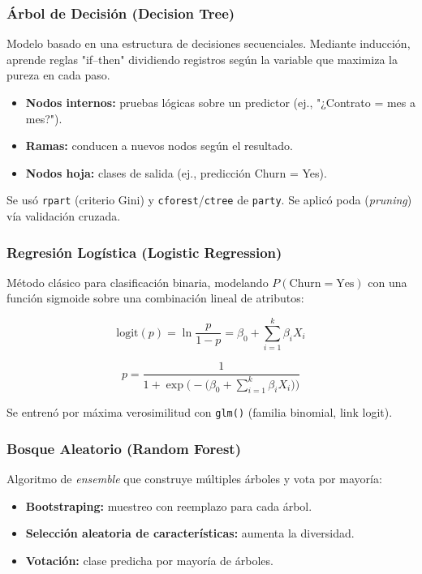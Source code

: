 \documentclass[conference]{IEEEtran}
\begin{document}
\subsubsection{Árbol de Decisión (Decision Tree)}
Modelo basado en una estructura de decisiones secuenciales. Mediante inducción, aprende reglas "if–then" dividiendo registros según la variable que maximiza la pureza en cada paso.

\begin{itemize}
	\item \textbf{Nodos internos:} pruebas lógicas sobre un predictor (ej., "¿Contrato = mes a mes?").
	\item \textbf{Ramas:} conducen a nuevos nodos según el resultado.
	\item \textbf{Nodos hoja:} clases de salida (ej., predicción Churn = Yes).
\end{itemize}

Se usó \texttt{rpart} (criterio Gini) y \texttt{cforest}/\texttt{ctree} de \texttt{party}. Se aplicó poda (\emph{pruning}) vía validación cruzada.

\subsubsection{Regresión Logística (Logistic Regression)}
Método clásico para clasificación binaria, modelando $P(\text{Churn}=\text{Yes})$ con una función sigmoide sobre una combinación lineal de atributos:

\begin{equation}
	\mathrm{logit}(p)=\ln\frac{p}{1-p}=\beta_0 + \sum_{i=1}^k \beta_i X_i
\end{equation}

\begin{equation}
	p=\frac{1}{1+\exp\bigl(-\bigl(\beta_0 + \sum_{i=1}^k \beta_i X_i\bigr)\bigr)}
\end{equation}

Se entrenó por máxima verosimilitud con \texttt{glm()} (familia binomial, link logit).

\subsubsection{Bosque Aleatorio (Random Forest)}
Algoritmo de \emph{ensemble} que construye múltiples árboles y vota por mayoría:

\begin{itemize}
	\item \textbf{Bootstraping:} muestreo con reemplazo para cada árbol.
	\item \textbf{Selección aleatoria de características:} aumenta la diversidad.
	\item \textbf{Votación:} clase predicha por mayoría de árboles.
\end{itemize}
\end{document}
